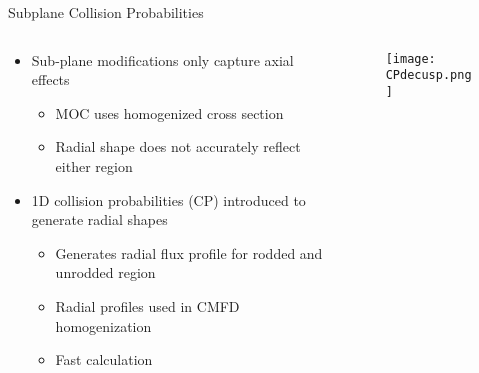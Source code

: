 \begin{frame}[t]{Subplane Collision Probabilities}
    
    \begin{columns}
        \begin{column}{0.45\textwidth}
            \begin{itemize}
                \item Sub-plane modifications only capture axial effects
                \begin{itemize}
                    \item MOC uses homogenized cross section
                    \item Radial shape does not accurately reflect either region
                \end{itemize}
                \item 1D collision probabilities (CP) introduced to generate radial 
                shapes
                \begin{itemize}
                    \item Generates radial flux profile for rodded and unrodded region
                    \item Radial profiles used in CMFD homogenization
                    \item Fast calculation
                \end{itemize}
            \end{itemize}
        \end{column}
        \begin{column}{0.55\textwidth}
            \begin{figure}[h]
                \centering
                \texttt{[image: CPdecusp.png]}
            \end{figure}
        \end{column}
    \end{columns}
    
\end{frame}


